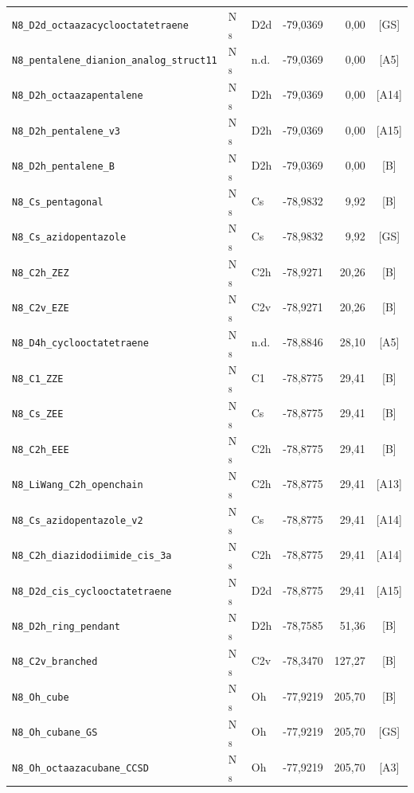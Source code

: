 \begin{longtable}{@{}p{4.4cm}lp{1.5cm}rrc@{}}
\texttt{N8\_D2d\_octaazacyclooctatetraene} & N$_{8}$ & D2d & -79{,}0369 & 0{,}00 & [GS] \\
\texttt{N8\_pentalene\_dianion\_analog\_struct11} & N$_{8}$ & n.d. & -79{,}0369 & 0{,}00 & [A5] \\
\texttt{N8\_D2h\_octaazapentalene} & N$_{8}$ & D2h & -79{,}0369 & 0{,}00 & [A14] \\
\texttt{N8\_D2h\_pentalene\_v3} & N$_{8}$ & D2h & -79{,}0369 & 0{,}00 & [A15] \\
\texttt{N8\_D2h\_pentalene\_B} & N$_{8}$ & D2h & -79{,}0369 & 0{,}00 & [B] \\
\texttt{N8\_Cs\_pentagonal} & N$_{8}$ & Cs & -78{,}9832 & 9{,}92 & [B] \\
\texttt{N8\_Cs\_azidopentazole} & N$_{8}$ & Cs & -78{,}9832 & 9{,}92 & [GS] \\
\texttt{N8\_C2h\_ZEZ} & N$_{8}$ & C2h & -78{,}9271 & 20{,}26 & [B] \\
\texttt{N8\_C2v\_EZE} & N$_{8}$ & C2v & -78{,}9271 & 20{,}26 & [B] \\
\texttt{N8\_D4h\_cyclooctatetraene} & N$_{8}$ & n.d. & -78{,}8846 & 28{,}10 & [A5] \\
\texttt{N8\_C1\_ZZE} & N$_{8}$ & C1 & -78{,}8775 & 29{,}41 & [B] \\
\texttt{N8\_Cs\_ZEE} & N$_{8}$ & Cs & -78{,}8775 & 29{,}41 & [B] \\
\texttt{N8\_C2h\_EEE} & N$_{8}$ & C2h & -78{,}8775 & 29{,}41 & [B] \\
\texttt{N8\_LiWang\_C2h\_openchain} & N$_{8}$ & C2h & -78{,}8775 & 29{,}41 & [A13] \\
\texttt{N8\_Cs\_azidopentazole\_v2} & N$_{8}$ & Cs & -78{,}8775 & 29{,}41 & [A14] \\
\texttt{N8\_C2h\_diazidodiimide\_cis\_3a} & N$_{8}$ & C2h & -78{,}8775 & 29{,}41 & [A14] \\
\texttt{N8\_D2d\_cis\_cyclooctatetraene} & N$_{8}$ & D2d & -78{,}8775 & 29{,}41 & [A15] \\
\texttt{N8\_D2h\_ring\_pendant} & N$_{8}$ & D2h & -78{,}7585 & 51{,}36 & [B] \\
\texttt{N8\_C2v\_branched} & N$_{8}$ & C2v & -78{,}3470 & 127{,}27 & [B] \\
\texttt{N8\_Oh\_cube} & N$_{8}$ & Oh & -77{,}9219 & 205{,}70 & [B] \\
\texttt{N8\_Oh\_cubane\_GS} & N$_{8}$ & Oh & -77{,}9219 & 205{,}70 & [GS] \\
\texttt{N8\_Oh\_octaazacubane\_CCSD} & N$_{8}$ & Oh & -77{,}9219 & 205{,}70 & [A3] \\

\end{longtable}
